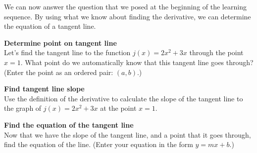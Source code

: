 \documentclass[pdftex, brazil, 12pt, twoside]{article}
\begin{document}
We can now answer the question that we posed at the beginning of the learning
sequence. By using what we know about finding the derivative, we can determine
the equation of a tangent line.

\begin{exercise}
  \textbf{Determine point on tangent line}\\%
  Let's find the tangent line to the function $j(x) = 2x^2 + 3x$ through the point
  $x=1$. What point do we automatically know that this tangent line goes through?
  (Enter the point as an ordered pair: $(a, b)$.)
\end{exercise}

\begin{exercise}
  \textbf{Find tangent line slope}\\%
  Use the definition of the derivative to calculate the slope of the tangent line
  to the graph of $j(x) = 2x^2 + 3x$ at the point $x=1$.
\end{exercise}

\begin{exercise}
  \textbf{Find the equation of the tangent line}\\%
  Now that we have the slope of the tangent line, and a point that it goes through,
  find the equation of the line. (Enter your equation in the form
  $y = mx + b$.)
\end{exercise}














\end{document}
